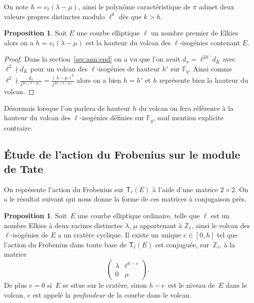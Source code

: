 \documentclass[10pt,a4paper]{book}
\theoremstyle{plain}
\theoremstyle{definition}
\theoremstyle{definition}
\theoremstyle{definition}
\theoremstyle{definition}
\newtheorem{prop}[thm]{Proposition}
\theoremstyle{definition}
\theoremstyle{remark}
\theoremstyle{remark}
\theoremstyle{definition}
\begin{document}
On note $h=v_{\ell}(\lambda - \mu)$, ainsi le polynôme caractéristique de 
$\pi$ admet deux valeurs propres distinctes modulo $\ell^k$ dès que $k > h$.

\begin{prop}
\label{pro:hau:vol}
Soit $E$ une courbe elliptique $\ell$ un nombre premier de Elkies alors on a 
$h=v_{\ell}(\lambda - \mu)$ est la hauteur du volcan des $\ell$-isogénies 
contenant $E$.
\end{prop}

\begin{proof}
Dans la section~\ref{sec:ann:end} on a vu que l'on avait $d_{\pi}=\ell^{2h'}d_K$ 
avec $\ell^2 \nmid d_K$ pour un volcan des $\ell$-isogénies de hauteur $h'$ sur 
$\mathbb{F}_q$. Ainsi comme $\ell^{2} \nmid  \frac{d_\pi}{\ell^{2 v_{\ell}
(\lambda - \mu)}}=\frac{(\lambda - \mu)^2}{\ell^{2 v_{\ell}(\lambda - \mu)}}$ 
alors on a bien $h=h'$ et $h$ représente bien la hauteur du volcan. 
\end{proof}
 
Désormais lorsque l'on parlera de hauteur $h$ du volcan on fera référence à la
hauteur du volcan des $\ell$-isogénies définies sur $\mathbb{F}_q$, sauf mention 
 explicite contraire.
\subsection{\'Etude de l'action du Frobenius sur le module de Tate}
\label{subs:elk:dir}

On représente l'action du Frobenius sur $\mathsf{T}_{\ell}(E)$ à l'aide d'une matrice $
2 \times 2$. On a le résultat suivant qui nous donne la forme de ces matrices à
conjugaison près.


\begin{prop}\label{pro:mat:fro}
Soit~$E$ une courbe elliptique ordinaire, telle que $\ell$ est un nombre Elkies
à deux racines distinctes $\lambda$, $\mu$ appartenant à $\mathbb{Z}_{\ell}$,
ainsi le volcan des $\ell$-isogénies de $E$ a un cratère cyclique.
Il existe un unique $e \in [ 0, h]$ tel que 
l'action du Frobenius dans toute base de $\mathsf{T}_{\ell}(E)$  
est conjuguée, sur~$\mathbb{Z}_{\ell}$,
à la matrice 
\begin{equation*}
\left ( \begin{matrix}\lambda & \ell^{h-e} \\ 0 & \mu
\end{matrix}\right ).
\end{equation*}
De plus $e = 0$ si~$E$ se situe sur le cratère,
sinon $h - e$~est le niveau de~$E$ dans le volcan, $e$ est appelé la \emph{profondeur}
de la courbe dans le volcan.
\end{prop}
\end{document}

